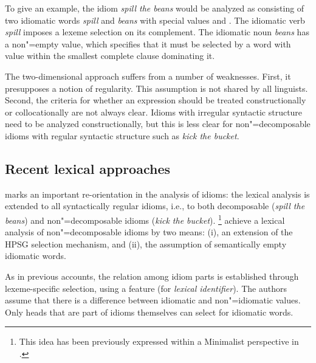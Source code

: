 \documentclass[output=paper
                ,modfonts
                ,nonflat
	        ,collection
	        ,collectionchapter
	        ,collectiontoclongg
 	        ,biblatex
                ,babelshorthands
                ,newtxmath
                ,draftmode
                ,colorlinks, citecolor=brown
]{./langsci/langscibook}
\begin{document}
To give an example, the idiom \emph{spill the beans} would be analyzed as consisting of two  idiomatic words \emph{spill} and \emph{beans} with special  values  and . The idiomatic verb \emph{spill} imposes a lexeme selection on its complement. The idiomatic noun \emph{beans} has a non"=empty  value, which specifies that it must be selected by a word with  value  within the smallest complete clause dominating it.


The two-dimensional approach suffers from a number of weaknesses. 
First, it presupposes a notion of regularity. This assumption is not shared by all linguists.
Second, the criteria for whether an expression should be treated constructionally or collocationally are not always clear. 
Idioms with irregular syntactic structure need to be analyzed constructionally, but this is less clear for non"=decomposable idioms with regular syntactic structure such as \emph{kick the bucket}.



\subsection{Recent lexical approaches}
\label{Sec-RecentLexical}

\citet{KSF2015a} marks an important re-orientation in the analysis of idioms: the lexical analysis is extended to all syntactically regular idioms, i.e., to both decomposable (\emph{spill the beans}) and non"=decomposable idioms (\emph{kick the bucket}).%
\footnote{This idea has been previously expressed within a  Minimalist perspective in \citet{Everaert:10}. 
}
%
\citet{KSF2015a} achieve a lexical analysis of non"=decomposable idioms by two means: (i), an extension of the HPSG selection mechanism, and (ii), the assumption of semantically empty idiomatic words. 

As in previous accounts, the relation among idiom parts is established through lexeme-specific selection, using a feature  (for \emph{lexical identifier}). 
The authors assume that there is a difference between idiomatic and non"=idiomatic  values. 
Only heads that are part of idioms themselves can select for idiomatic words. 
\end{document}
